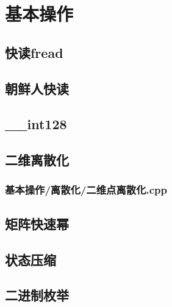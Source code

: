 \documentclass[landscape,twoside,a4paper]{article}
\begin{document}
\small

\newpage
\pagestyle{empty}
\renewcommand{\contentsname}{目录}
\tableofcontents
\newpage\clearpage
\newpage
\pagestyle{fancy}
\setcounter{page}{1}   %

\section{基本操作}

\subsection{快读fread}


\subsection{朝鲜人快读}


\subsection{\_\_int128}


\subsection{二维离散化}
\subsubsection{基本操作/离散化/二维点离散化.cpp}

\subsection{矩阵快速幂}


\subsection{状态压缩}


\subsection{二进制枚举}

\end{document}
